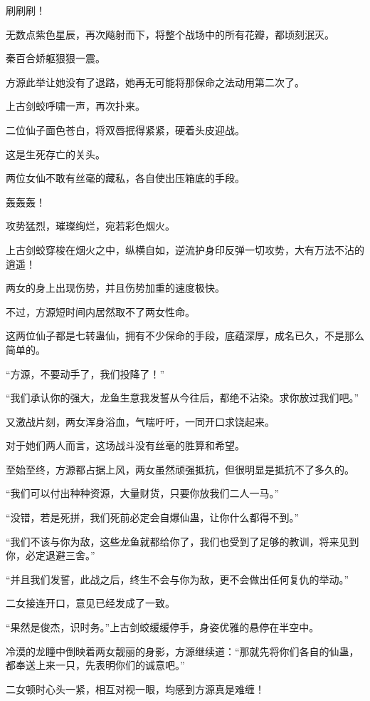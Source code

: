 \begin{this_body}
刷刷刷！

无数点紫色星辰，再次飚射而下，将整个战场中的所有花瓣，都顷刻泯灭。

秦百合娇躯狠狠一震。

方源此举让她没有了退路，她再无可能将那保命之法动用第二次了。

上古剑蛟呼啸一声，再次扑来。

二位仙子面色苍白，将双唇抿得紧紧，硬着头皮迎战。

这是生死存亡的关头。

两位女仙不敢有丝毫的藏私，各自使出压箱底的手段。

轰轰轰！

攻势猛烈，璀璨绚烂，宛若彩色烟火。

上古剑蛟穿梭在烟火之中，纵横自如，逆流护身印反弹一切攻势，大有万法不沾的逍遥！

两女的身上出现伤势，并且伤势加重的速度极快。

不过，方源短时间内居然取不了两女性命。

这两位仙子都是七转蛊仙，拥有不少保命的手段，底蕴深厚，成名已久，不是那么简单的。

“方源，不要动手了，我们投降了！”

“我们承认你的强大，龙鱼生意我发誓从今往后，都绝不沾染。求你放过我们吧。”

又激战片刻，两女浑身浴血，气喘吁吁，一同开口求饶起来。

对于她们两人而言，这场战斗没有丝毫的胜算和希望。

至始至终，方源都占据上风，两女虽然顽强抵抗，但很明显是抵抗不了多久的。

“我们可以付出种种资源，大量财货，只要你放我们二人一马。”

“没错，若是死拼，我们死前必定会自爆仙蛊，让你什么都得不到。”

“我们不该与你为敌，这些龙鱼就都给你了，我们也受到了足够的教训，将来见到你，必定退避三舍。”

“并且我们发誓，此战之后，终生不会与你为敌，更不会做出任何复仇的举动。”

二女接连开口，意见已经发成了一致。

“果然是俊杰，识时务。”上古剑蛟缓缓停手，身姿优雅的悬停在半空中。

冷漠的龙瞳中倒映着两女靓丽的身影，方源继续道：“那就先将你们各自的仙蛊，都奉送上来一只，先表明你们的诚意吧。”

二女顿时心头一紧，相互对视一眼，均感到方源真是难缠！


\end{this_body}
